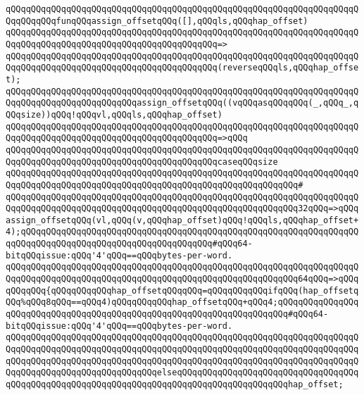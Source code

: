 \verb|qQQqqQQqqQQqqQQqqQQqqQQqqQQqqQQqqQQqqQQqqQQqqQQqqQQqqQQqqQQqqQQqqQQqqQQqqQQqqQQqfunqQQqassign_offsetqQQq([],qQQqls,qQQqhap_offset)|\newline
\verb|qQQqqQQqqQQqqQQqqQQqqQQqqQQqqQQqqQQqqQQqqQQqqQQqqQQqqQQqqQQqqQQqqQQqqQQqqQQqqQQqqQQqqQQqqQQqqQQqqQQqqQQqqQQqqQQq=>|\newline
\verb|qQQqqQQqqQQqqQQqqQQqqQQqqQQqqQQqqQQqqQQqqQQqqQQqqQQqqQQqqQQqqQQqqQQqqQQqqQQqqQQqqQQqqQQqqQQqqQQqqQQqqQQqqQQqqQQq(reverseqQQqls,qQQqhap_offset);|\newline
\newline
\verb|qQQqqQQqqQQqqQQqqQQqqQQqqQQqqQQqqQQqqQQqqQQqqQQqqQQqqQQqqQQqqQQqqQQqqQQqqQQqqQQqqQQqqQQqqQQqqQQqassign_offsetqQQq((vqQQqasqQQqqQQq(_,qQQq_,qQQqsize))qQQq!qQQqvl,qQQqls,qQQqhap_offset)|\newline
\verb|qQQqqQQqqQQqqQQqqQQqqQQqqQQqqQQqqQQqqQQqqQQqqQQqqQQqqQQqqQQqqQQqqQQqqQQqqQQqqQQqqQQqqQQqqQQqqQQqqQQqqQQqqQQqqQQq=>qQQq|\newline
\verb|qQQqqQQqqQQqqQQqqQQqqQQqqQQqqQQqqQQqqQQqqQQqqQQqqQQqqQQqqQQqqQQqqQQqqQQqqQQqqQQqqQQqqQQqqQQqqQQqqQQqqQQqqQQqqQQqcaseqQQqsize|\newline
\verb|qQQqqQQqqQQqqQQqqQQqqQQqqQQqqQQqqQQqqQQqqQQqqQQqqQQqqQQqqQQqqQQqqQQqqQQqqQQqqQQqqQQqqQQqqQQqqQQqqQQqqQQqqQQqqQQqqQQqqQQqqQQqqQQq#|\newline
\verb|qQQqqQQqqQQqqQQqqQQqqQQqqQQqqQQqqQQqqQQqqQQqqQQqqQQqqQQqqQQqqQQqqQQqqQQqqQQqqQQqqQQqqQQqqQQqqQQqqQQqqQQqqQQqqQQqqQQqqQQqqQQqqQQq32qQQq=>qQQqassign_offsetqQQq(vl,qQQq(v,qQQqhap_offset)qQQq!qQQqls,qQQqhap_offset+4);qQQqqQQqqQQqqQQqqQQqqQQqqQQqqQQqqQQqqQQqqQQqqQQqqQQqqQQqqQQqqQQqqQQqqQQqqQQqqQQqqQQqqQQqqQQqqQQqqQQqqQQqqQQq#qQQq64-bitqQQqissue:qQQq'4'qQQq==qQQqbytes-per-word.|\newline
\newline
\verb|qQQqqQQqqQQqqQQqqQQqqQQqqQQqqQQqqQQqqQQqqQQqqQQqqQQqqQQqqQQqqQQqqQQqqQQqqQQqqQQqqQQqqQQqqQQqqQQqqQQqqQQqqQQqqQQqqQQqqQQqqQQqqQQq64qQQq=>qQQqqQQqqQQq{qQQqqQQqqQQqhap_offsetqQQqqQQq=qQQqqQQqqQQqifqQQq(hap_offsetqQQq%qQQq8qQQq==qQQq4)qQQqqQQqqQQqhap_offsetqQQq+qQQq4;qQQqqQQqqQQqqQQqqQQqqQQqqQQqqQQqqQQqqQQqqQQqqQQqqQQqqQQqqQQqqQQqqQQqqQQq#qQQq64-bitqQQqissue:qQQq'4'qQQq==qQQqbytes-per-word.|\newline
\verb|qQQqqQQqqQQqqQQqqQQqqQQqqQQqqQQqqQQqqQQqqQQqqQQqqQQqqQQqqQQqqQQqqQQqqQQqqQQqqQQqqQQqqQQqqQQqqQQqqQQqqQQqqQQqqQQqqQQqqQQqqQQqqQQqqQQqqQQqqQQqqQQqqQQqqQQqqQQqqQQqqQQqqQQqqQQqqQQqqQQqqQQqqQQqqQQqqQQqqQQqqQQqqQQqqQQqqQQqqQQqqQQqqQQqqQQqqQQqqQQqelseqQQqqQQqqQQqqQQqqQQqqQQqqQQqqQQqqQQqqQQqqQQqqQQqqQQqqQQqqQQqqQQqqQQqqQQqqQQqqQQqqQQqqQQqqQQqhap_offset;|\newline

